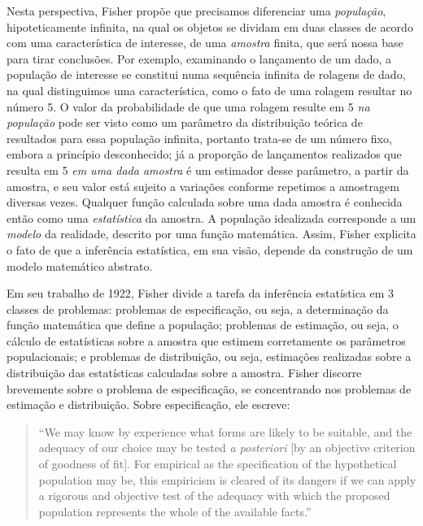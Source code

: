 Nesta perspectiva, Fisher propõe que precisamos diferenciar uma {\em população}, hipoteticamente infinita, na qual os objetos se dividam em duas
classes de acordo com uma característica de interesse, de uma {\em amostra} finita, que será nossa base para tirar conclusões.
Por exemplo, examinando o lançamento de um dado, a população de interesse se constitui numa sequência infinita de rolagens
de dado, na qual distinguimos uma característica, como o fato de uma rolagem resultar no número 5. O valor da probabilidade de que
uma rolagem resulte em 5 {\em na população} pode ser visto como um parâmetro da distribuição teórica de resultados para essa
população infinita, portanto trata-se de um número fixo, embora a princípio desconhecido; 
já a proporção de lançamentos realizados que resulta em 5 {\em em uma dada amostra} é um estimador desse parâmetro,
a partir da amostra, e seu valor está sujeito a variações conforme repetimos a amostragem diversas vezes.
Qualquer função calculada sobre uma dada amostra é conhecida então como uma {\em estatística} da amostra.
A população idealizada corresponde a um {\em modelo} da realidade, descrito por uma função matemática.
Assim, Fisher explicita o fato de que a inferência estatística, em sua visão, depende da construção de um modelo matemático
abstrato.

Em seu trabalho de 1922, Fisher divide a tarefa da inferência estatística em 3 classes de 
problemas: problemas de especificação, ou seja, a determinação da função
matemática que define a população; problemas de estimação, ou seja, o cálculo de estatísticas sobre a amostra que estimem 
corretamente os parâmetros populacionais; e problemas de distribuição, ou seja, estimações realizadas sobre a distribuição
das estatísticas calculadas sobre a amostra. Fisher discorre brevemente sobre o problema de especificação,
se concentrando nos problemas de estimação e distribuição. Sobre especificação, ele escreve:

\begin{quote}
``We may know by experience what forms are likely to be suitable, and the adequacy of our choice may be
tested {\em a posteriori} [by an objective criterion of goodness of fit].
For empirical as the specification of the hypothetical population may be, this empiricism is cleared of its dangers if
we can apply a rigorous and objective test of the adequacy with which the proposed population represents the whole of
the available facts.''\citep{Fisher1922}
\end{quote}

